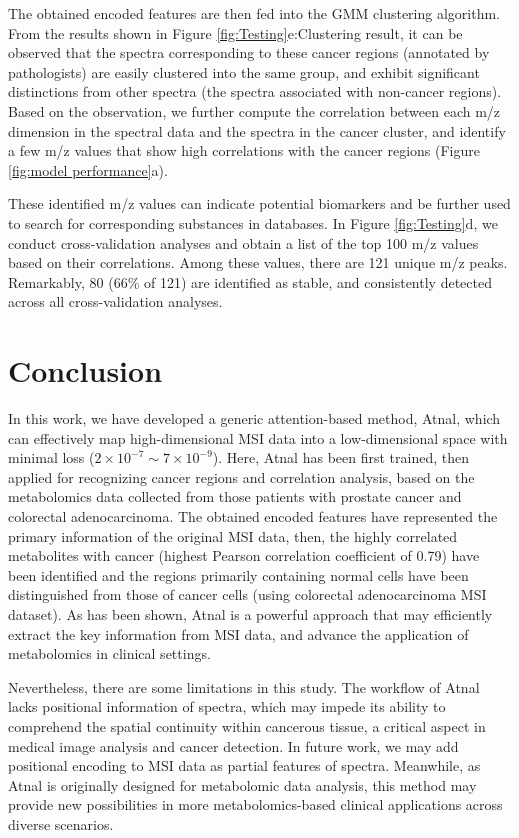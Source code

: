 \documentclass{WileyMSP-template}
\begin{document}
The obtained encoded features are then fed into the 
GMM clustering algorithm.  
From the results shown in Figure \ref{fig:Testing}e:Clustering result, 
it can be observed that the spectra  
corresponding to these cancer regions (annotated by pathologists) are 
easily clustered into the same group, and exhibit 
significant distinctions from other spectra (the spectra associated with non-cancer regions). 
Based on the observation, 
we further compute the correlation between each m/z dimension in the 
spectral data and the spectra in the cancer cluster, and identify a few m/z 
values that show high correlations with the cancer regions 
(Figure \ref{fig:model performance}a). 

These identified m/z values can 
indicate potential biomarkers and be further used to search for 
corresponding substances in databases. In Figure \ref{fig:Testing}d, 
we conduct cross-validation analyses and obtain a list of the top 
100 m/z values based on their correlations. Among these values, there are 121 unique 
m/z peaks. Remarkably, 
80 (66\% of 121) are identified as stable, and consistently 
detected across all cross-validation analyses. 


\section{Conclusion}
In this work, we have developed a generic attention-based method, 
Atnal, which can effectively map 
high-dimensional MSI data into a low-dimensional space with minimal 
loss ($2 \times 10^{-7} \sim 7 \times 10^{-9}$). 
Here, Atnal has been first trained, 
then applied for recognizing cancer 
regions and correlation analysis, based on the metabolomics data 
collected from those patients with prostate cancer and 
colorectal adenocarcinoma. 
The obtained encoded features have represented the primary 
information of the original MSI data, 
then, the highly correlated metabolites with cancer 
(highest Pearson correlation coefficient of 0.79) have been identified 
and the regions primarily containing normal 
cells have been distinguished from those of cancer cells 
(using colorectal adenocarcinoma MSI dataset). 
As has been shown, Atnal is a powerful approach that may 
efficiently extract the key information 
from MSI data, and  advance the application 
of metabolomics in clinical settings. 
 
Nevertheless, there are some limitations in this study. 
The workflow of Atnal lacks positional information of spectra, which may impede 
its ability to comprehend the spatial continuity within cancerous tissue, 
a critical aspect in medical image analysis and cancer detection. 
In future work, we may add positional encoding to MSI data as partial 
features of spectra. 
Meanwhile, as Atnal is originally designed for metabolomic data analysis,   
this method may provide new possibilities in more 
metabolomics-based clinical applications across diverse scenarios. 
\end{document}

